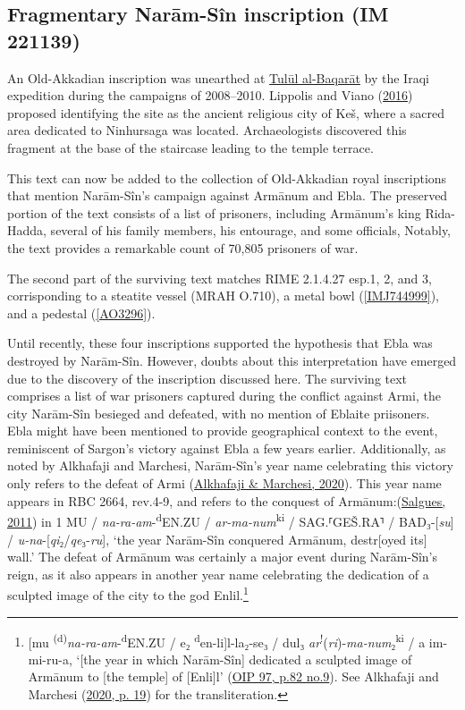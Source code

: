 \documentclass[
]{book}
\begin{document}
\hypertarget{IM221139}{%
\subsection{Fragmentary Narām-Sîn inscription (IM 221139)}\label{IM221139}}

An Old-Akkadian inscription was unearthed at \href{https://pleiades.stoa.org/places/698215287}{Tulūl al-Baqarāt} by the Iraqi expedition during the campaigns of 2008--2010. Lippolis and Viano (\protect\hyperlink{ref-LippolisViano2016}{2016}) proposed identifying the site as the ancient religious city of Keš, where a sacred area dedicated to Ninhursaga was located. Archaeologists discovered this fragment at the base of the staircase leading to the temple terrace.

This text can now be added to the collection of Old-Akkadian royal inscriptions that mention Narām-Sîn's campaign against Armānum and Ebla. The preserved portion of the text consists of a list of prisoners, including Armānum's king Rida-Hadda, several of his family members, his entourage, and some officials, Notably, the text provides a remarkable count of 70,805 prisoners of war.

The second part of the surviving text matches RIME 2.1.4.27 esp.1, 2, and 3, corrisponding to a steatite vessel (MRAH O.710), a metal bowl (\ref{IMJ744999}), and a pedestal (\ref{AO3296}).

Until recently, these four inscriptions supported the hypothesis that Ebla was destroyed by Narām-Sîn. However, doubts about this interpretation have emerged due to the discovery of the inscription discussed here. The surviving text comprises a list of war prisoners captured during the conflict against Armi, the city Narām-Sîn besieged and defeated, with no mention of Eblaite priisoners. Ebla might have been mentioned to provide geographical context to the event, reminiscent of Sargon's victory against Ebla a few years earlier. Additionally, as noted by Alkhafaji and Marchesi, Narām-Sîn's year name celebrating this victory only refers to the defeat of Armi (\protect\hyperlink{ref-AlkhafajiMarchesi2020}{Alkhafaji \& Marchesi, 2020}). This year name appears in RBC 2664, rev.4-9, and refers to the conquest of Armānum:(\protect\hyperlink{ref-Salgues2011}{Salgues, 2011}) in 1 MU / \emph{na-ra-am}-\textsuperscript{d}EN.ZU / \emph{ar-ma-num}\textsuperscript{ki} / SAG.⸢GEŠ.RA⸣ / BAD₃-{[}\emph{su}{]} / \emph{u-na}-{[}\emph{qi}₂/\emph{qe}₃-\emph{ru}{]}, `the year Narām-Sîn conquered Armānum, destr{[}oyed its{]} wall.' The defeat of Armānum was certainly a major event during Narām-Sîn's reign, as it also appears in another year name celebrating the dedication of a sculpted image of the city to the god Enlil.\footnote{{[}mu \textsuperscript{(d)}\emph{na-ra-am}-\textsuperscript{d}EN.ZU / e₂ \textsuperscript{d}en-li{]}l-la₂-se₃ / dul₃ \emph{ar}\textsuperscript{!}(\emph{ri})-\emph{ma-num}₂\textsuperscript{ki} / a im-mi-ru-a, `{[}the year in which Narām-Sîn{]} dedicated a sculpted image of Armānum to {[}the temple{]} of {[}Enli{]}l' (\href{https://cdli.mpiwg-berlin.mpg.de/artifacts/216062}{OIP 97, p.82 no.9}). See Alkhafaji and Marchesi (\protect\hyperlink{ref-AlkhafajiMarchesi2020}{2020, p. 19}) for the transliteration.}
\end{document}
